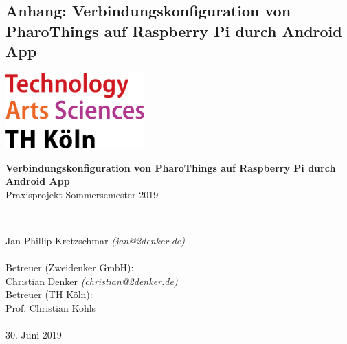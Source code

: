     \pagebreak
    \appendix
    \stopcontents

    \startcontents[sections]
    \begin{titlepage}
    \section{Anhang: Verbindungskonfiguration von PharoThings auf Raspberry Pi durch Android App}
    \includegraphics[width=0.4\textwidth]{../latex-ai-project/th_logo.png}
    ~\\[2.5cm]
    \begin{center}
    \textbf{\huge Verbindungskonfiguration von PharoThings auf Raspberry Pi durch Android App}\\[0.5cm]
    {\Large Praxisprojekt Sommersemester 2019}
    \vfill
    \end{center}
    ~\\[2.0cm]
    \begin{flushright}
    {\large Jan Phillip Kretzschmar \it{(jan@2denker.de)}}\\[0.1cm]
    ~\\[1.0cm]
    {\large Betreuer (Zweidenker GmbH):}\\[0.1cm]
    {\large Christian Denker \it{(christian@2denker.de)}}
    ~\\[0.5cm]
    {\large Betreuer (TH Köln):}\\[0.1cm]
    {\large Prof. Christian Kohls}\\[0.1cm]

	~\\[1.0cm]
    {\large 30. Juni 2019}
	\end{flushright}
    \end{titlepage}

    \pagebreak
    \section*{\contentsname}
    \pagebreak

